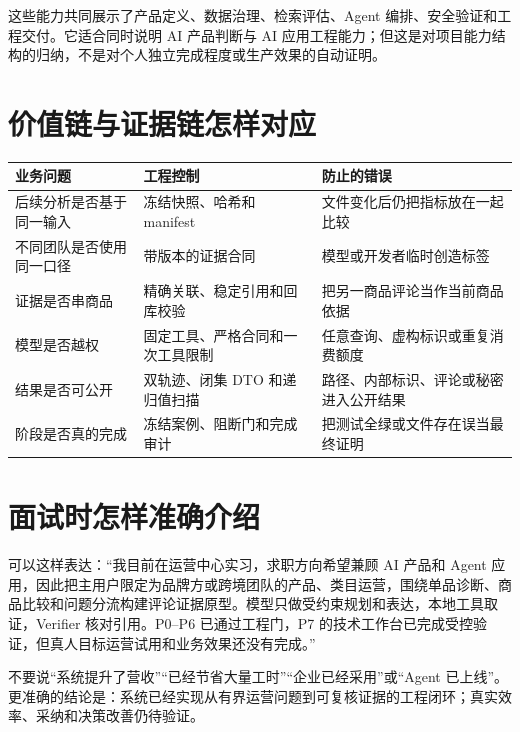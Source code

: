 \begin{inferencebox}
这些能力共同展示了产品定义、数据治理、检索评估、Agent 编排、安全验证和工程交付。它适合同时说明 AI 产品判断与 AI 应用工程能力；但这是对项目能力结构的归纳，不是对个人独立完成程度或生产效果的自动证明。
\end{inferencebox}

\section{价值链与证据链怎样对应}

\begin{tabularx}{0.94\linewidth}{>{\raggedright\arraybackslash}p{}X>{\raggedright\arraybackslash}p{}}
\toprule
业务问题 & 工程控制 & 防止的错误 \\
\midrule
后续分析是否基于同一输入 & 冻结快照、哈希和 manifest & 文件变化后仍把指标放在一起比较 \\
不同团队是否使用同一口径 & 带版本的证据合同 & 模型或开发者临时创造标签 \\
证据是否串商品 & 精确关联、稳定引用和回库校验 & 把另一商品评论当作当前商品依据 \\
模型是否越权 & 固定工具、严格合同和一次工具限制 & 任意查询、虚构标识或重复消费额度 \\
结果是否可公开 & 双轨迹、闭集 DTO 和递归值扫描 & 路径、内部标识、评论或秘密进入公开结果 \\
阶段是否真的完成 & 冻结案例、阻断门和完成审计 & 把测试全绿或文件存在误当最终证明 \\
\bottomrule
\end{tabularx}

\section{面试时怎样准确介绍}

\begin{interviewbox}
可以这样表达：“我目前在运营中心实习，求职方向希望兼顾 AI 产品和 Agent 应用，因此把主用户限定为品牌方或跨境团队的产品、类目运营，围绕单品诊断、商品比较和问题分流构建评论证据原型。模型只做受约束规划和表达，本地工具取证，Verifier 核对引用。P0--P6 已通过工程门，P7 的技术工作台已完成受控验证，但真人目标运营试用和业务效果还没有完成。”
\end{interviewbox}

\begin{boundarybox}
不要说“系统提升了营收”“已经节省大量工时”“企业已经采用”或“Agent 已上线”。更准确的结论是：系统已经实现从有界运营问题到可复核证据的工程闭环；真实效率、采纳和决策改善仍待验证。
\end{boundarybox}
